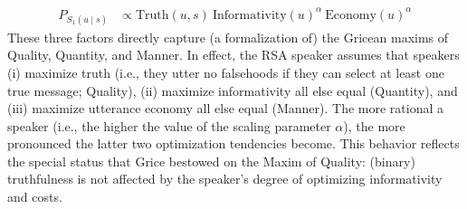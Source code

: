 \documentclass{sp}
\newcommand{\mf}[1]{\textcolor{orange}{[mf: #1]}}
\newcommand{\sem}[1]{\ensuremath{[\![#1]\!]}}
\begin{document}
\begin{align} \label{eq:S1-three-factor-formulation}
  P_{S_1(u\mid s)}   & \propto \text{Truth}(u,s) \ \text{Informativity}(u)^{\alpha} \ \text{Economy}(u)^{\alpha} %
\end{align}
These three factors directly capture (a formalization of) the Gricean maxims of Quality,
Quantity, and Manner. In effect, the RSA speaker assumes that speakers (i) maximize truth
(i.e., they utter no falsehoods if they can select at least one
true message; Quality), (ii) maximize informativity all else equal (Quantity), and (iii) maximize utterance
economy all else equal (Manner). The more rational a speaker (i.e., the higher the value of the scaling parameter $\alpha$), the more
pronounced the latter two optimization tendencies become. This behavior reflects the special
status that Grice bestowed on the Maxim of Quality: (binary) truthfulness is not affected by
the speaker's degree of optimizing informativity and costs.

\end{document}
